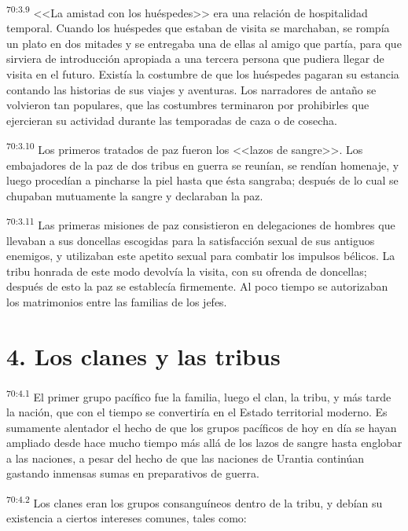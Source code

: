 \documentclass[twoside, 11pt]{book}
\begin{document}
\par
\textsuperscript{70:3.9} <<La amistad con los huéspedes>> era una relación de hospitalidad temporal. Cuando los huéspedes que estaban de visita se marchaban, se rompía un plato en dos mitades y se entregaba una de ellas al amigo que partía, para que sirviera de introducción apropiada a una tercera persona que pudiera llegar de visita en el futuro. Existía la costumbre de que los huéspedes pagaran su estancia contando las historias de sus viajes y aventuras. Los narradores de antaño se volvieron tan populares, que las costumbres terminaron por prohibirles que ejercieran su actividad durante las temporadas de caza o de cosecha.

\par
\textsuperscript{70:3.10} Los primeros tratados de paz fueron los <<lazos de sangre>>. Los embajadores de la paz de dos tribus en guerra se reunían, se rendían homenaje, y luego procedían a pincharse la piel hasta que ésta sangraba; después de lo cual se chupaban mutuamente la sangre y declaraban la paz.

\par
\textsuperscript{70:3.11} Las primeras misiones de paz consistieron en delegaciones de hombres que llevaban a sus doncellas escogidas para la satisfacción sexual de sus antiguos enemigos, y utilizaban este apetito sexual para combatir los impulsos bélicos. La tribu honrada de este modo devolvía la visita, con su ofrenda de doncellas; después de esto la paz se establecía firmemente. Al poco tiempo se autorizaban los matrimonios entre las familias de los jefes.

\section*{4. Los clanes y las tribus}
\par
\textsuperscript{70:4.1} El primer grupo pacífico fue la familia, luego el clan, la tribu, y más tarde la nación, que con el tiempo se convertiría en el Estado territorial moderno. Es sumamente alentador el hecho de que los grupos pacíficos de hoy en día se hayan ampliado desde hace mucho tiempo más allá de los lazos de sangre hasta englobar a las naciones, a pesar del hecho de que las naciones de Urantia continúan gastando inmensas sumas en preparativos de guerra.

\par
\textsuperscript{70:4.2} Los clanes eran los grupos consanguíneos dentro de la tribu, y debían su existencia a ciertos intereses comunes, tales como:
\end{document}
